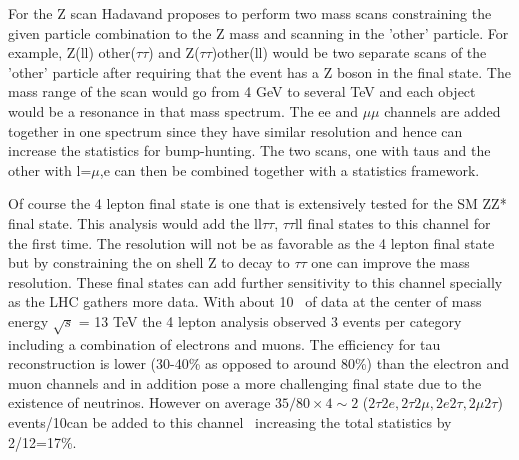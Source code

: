 For the Z scan Hadavand proposes to perform two mass scans constraining the given particle combination to the Z mass and scanning in the 'other' particle. 
For example, Z(ll) other($\tau\tau$) and Z($\tau\tau$)other(ll) would be two separate scans of the 'other' particle after requiring that the event has a Z boson in the final state. 
The mass range of the scan would go from 4 GeV to several TeV and each object would be a resonance in that mass spectrum. The ee and $\mu\mu$ channels are added together 
in one spectrum since they have similar resolution and hence can increase the statistics for bump-hunting.  
The two scans, one with taus and the other with l=$\mu$,e  can then be combined together with a statistics framework.  

Of course the 4 lepton final state is one that is extensively tested for the SM ZZ* final state. This analysis would add the ll$\tau\tau$, $\tau\tau$ll final states to this channel for the first time.  The resolution will not be as favorable as
the 4 lepton final state but by constraining the on shell Z to decay to $\tau \tau$ one can improve the mass resolution.  These final states can add further sensitivity to this channel specially as the LHC
gathers more data.  With about 10 \invfb\ of data at the center of mass energy $\sqrt s$ = 13 TeV the 4 lepton analysis observed 3 events per category including a combination of electrons and muons.  The efficiency for tau reconstruction is lower (30-40\% as opposed to around 80\%) than the electron and muon channels and in 
addition pose a more challenging final state due to the existence of neutrinos.
However on average $35/80\times4\sim 2$ ($2\tau2e, 2\tau2\mu, 2e2\tau,2\mu2\tau$) events/10\invfb can be added to this channel~\cite{2016:4l} increasing the total statistics by 2/12=17\%. 

